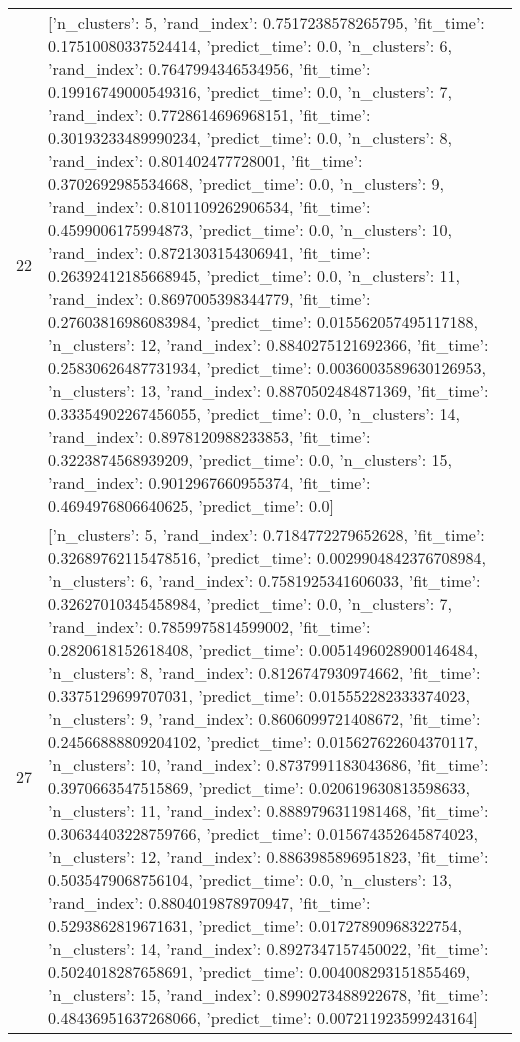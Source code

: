 \begin{tabular}{rl}
22 & [{'n_clusters': 5, 'rand_index': 0.7517238578265795, 'fit_time': 0.17510080337524414, 'predict_time': 0.0}, {'n_clusters': 6, 'rand_index': 0.7647994346534956, 'fit_time': 0.19916749000549316, 'predict_time': 0.0}, {'n_clusters': 7, 'rand_index': 0.7728614696968151, 'fit_time': 0.30193233489990234, 'predict_time': 0.0}, {'n_clusters': 8, 'rand_index': 0.801402477728001, 'fit_time': 0.3702692985534668, 'predict_time': 0.0}, {'n_clusters': 9, 'rand_index': 0.8101109262906534, 'fit_time': 0.4599006175994873, 'predict_time': 0.0}, {'n_clusters': 10, 'rand_index': 0.8721303154306941, 'fit_time': 0.26392412185668945, 'predict_time': 0.0}, {'n_clusters': 11, 'rand_index': 0.8697005398344779, 'fit_time': 0.27603816986083984, 'predict_time': 0.015562057495117188}, {'n_clusters': 12, 'rand_index': 0.8840275121692366, 'fit_time': 0.25830626487731934, 'predict_time': 0.0036003589630126953}, {'n_clusters': 13, 'rand_index': 0.8870502484871369, 'fit_time': 0.33354902267456055, 'predict_time': 0.0}, {'n_clusters': 14, 'rand_index': 0.8978120988233853, 'fit_time': 0.3223874568939209, 'predict_time': 0.0}, {'n_clusters': 15, 'rand_index': 0.9012967660955374, 'fit_time': 0.4694976806640625, 'predict_time': 0.0}] \\
27 & [{'n_clusters': 5, 'rand_index': 0.7184772279652628, 'fit_time': 0.32689762115478516, 'predict_time': 0.0029904842376708984}, {'n_clusters': 6, 'rand_index': 0.7581925341606033, 'fit_time': 0.32627010345458984, 'predict_time': 0.0}, {'n_clusters': 7, 'rand_index': 0.7859975814599002, 'fit_time': 0.2820618152618408, 'predict_time': 0.0051496028900146484}, {'n_clusters': 8, 'rand_index': 0.8126747930974662, 'fit_time': 0.3375129699707031, 'predict_time': 0.015552282333374023}, {'n_clusters': 9, 'rand_index': 0.8606099721408672, 'fit_time': 0.24566888809204102, 'predict_time': 0.015627622604370117}, {'n_clusters': 10, 'rand_index': 0.8737991183043686, 'fit_time': 0.3970663547515869, 'predict_time': 0.020619630813598633}, {'n_clusters': 11, 'rand_index': 0.8889796311981468, 'fit_time': 0.30634403228759766, 'predict_time': 0.015674352645874023}, {'n_clusters': 12, 'rand_index': 0.8863985896951823, 'fit_time': 0.5035479068756104, 'predict_time': 0.0}, {'n_clusters': 13, 'rand_index': 0.8804019878970947, 'fit_time': 0.5293862819671631, 'predict_time': 0.01727890968322754}, {'n_clusters': 14, 'rand_index': 0.8927347157450022, 'fit_time': 0.5024018287658691, 'predict_time': 0.004008293151855469}, {'n_clusters': 15, 'rand_index': 0.8990273488922678, 'fit_time': 0.48436951637268066, 'predict_time': 0.007211923599243164}] \\

\end{tabular}
